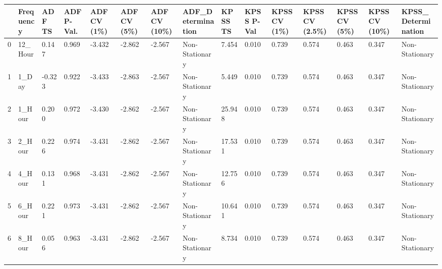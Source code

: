 \begin{tabular}{lllllllllllllll}
\toprule
 & Frequency & ADF TS & ADF P-Val. & ADF CV (1\%) & ADF CV (5\%) & ADF CV (10\%) & ADF_Determination & KPSS TS & KPSS P-Val & KPSS CV (1\%) & KPSS CV (2.5\%) & KPSS CV (5\%) & KPSS CV (10\%) & KPSS_Determination \\
\midrule
0 & 12_Hour & 0.147 & 0.969 & -3.432 & -2.862 & -2.567 & Non-Stationary & 7.454 & 0.010 & 0.739 & 0.574 & 0.463 & 0.347 & Non-Stationary \\
1 & 1_Day & -0.323 & 0.922 & -3.433 & -2.863 & -2.567 & Non-Stationary & 5.449 & 0.010 & 0.739 & 0.574 & 0.463 & 0.347 & Non-Stationary \\
2 & 1_Hour & 0.200 & 0.972 & -3.430 & -2.862 & -2.567 & Non-Stationary & 25.948 & 0.010 & 0.739 & 0.574 & 0.463 & 0.347 & Non-Stationary \\
3 & 2_Hour & 0.226 & 0.974 & -3.431 & -2.862 & -2.567 & Non-Stationary & 17.531 & 0.010 & 0.739 & 0.574 & 0.463 & 0.347 & Non-Stationary \\
4 & 4_Hour & 0.131 & 0.968 & -3.431 & -2.862 & -2.567 & Non-Stationary & 12.756 & 0.010 & 0.739 & 0.574 & 0.463 & 0.347 & Non-Stationary \\
5 & 6_Hour & 0.221 & 0.973 & -3.431 & -2.862 & -2.567 & Non-Stationary & 10.641 & 0.010 & 0.739 & 0.574 & 0.463 & 0.347 & Non-Stationary \\
6 & 8_Hour & 0.056 & 0.963 & -3.431 & -2.862 & -2.567 & Non-Stationary & 8.734 & 0.010 & 0.739 & 0.574 & 0.463 & 0.347 & Non-Stationary \\
\bottomrule
\end{tabular}
